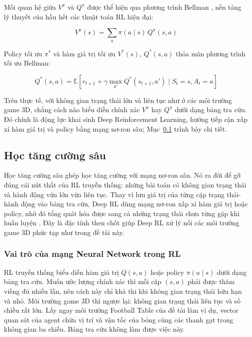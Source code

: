 \indent Mối quan hệ giữa $V^\pi$ và $Q^\pi$ được thể hiện qua phương trình Bellman
\cite{bellman1957markovian}, nền tảng lý thuyết của hầu hết các thuật toán RL hiện
đại:

\begin{equation}
    V^\pi(s) = \sum_{a} \pi(a \mid s) \, Q^\pi(s, a)
\end{equation}

\indent Policy tối ưu $\pi^*$ và hàm giá trị tối ưu $V^*(s)$, $Q^*(s,a)$ thỏa mãn
phương trình tối ưu Bellman:

\begin{equation}
    Q^*(s, a) = \mathbb{E} \left[ r_{t+1} + \gamma \max_{a'} Q^*(s_{t+1}, a')
                \mid S_t = s, A_t = a \right]
\end{equation}

\indent Trên thực tế, với không gian trạng thái lớn và liên tục như ở các môi trường game
3D, chẳng cách nào biểu diễn chính xác $V^\pi$ hay $Q^\pi$ dưới dạng bảng tra cứu. Đó
chính là động lực khai sinh Deep Reinforcement Learning, hướng tiếp cận xấp xỉ hàm giá
trị và policy bằng mạng nơ-ron sâu; Mục~\ref{sub:deeprl} trình bày chi tiết.

\subsection{Học tăng cường sâu}
\label{sub:deeprl}
\indent Học tăng cường sâu ghép học tăng cường với mạng
nơ-ron sâu. Nó ra đời để gỡ đúng cái nút thắt của RL truyền thống:
những bài toán có không gian trạng thái và hành động vừa lớn vừa liên tục. Thay vì lưu
giá trị của từng cặp trạng thái-hành động vào bảng tra cứu, Deep RL dùng mạng nơ-ron xấp
xỉ hàm giá trị hoặc policy, nhờ đó tổng quát hóa được sang cả những trạng thái chưa từng
gặp khi huấn luyện \cite{lecun2015deep}. Đây là đặc tính then chốt giúp Deep RL xử lý nổi
các môi trường game 3D phức tạp như trong đề tài này.

\subsubsection{Vai trò của mạng Neural Network trong RL}
\indent RL truyền thống biểu diễn hàm giá trị $Q(s, a)$ hoặc policy $\pi(a \mid s)$ dưới
dạng bảng tra cứu. Muốn ước lượng chính xác thì mỗi cặp $(s, a)$ phải được
thăm viếng đủ nhiều lần, nên cách này chỉ khả thi khi không gian trạng thái hữu hạn và
nhỏ. Môi trường game 3D thì ngược lại: không gian trạng thái liên tục và số chiều rất
lớn. Lấy ngay môi trường Football Table của đề tài làm ví dụ, vector quan sát của agent
chứa vị trí và vận tốc của bóng cùng các thanh gạt trong không gian ba chiều. Bảng tra
cứu không làm được việc này.

